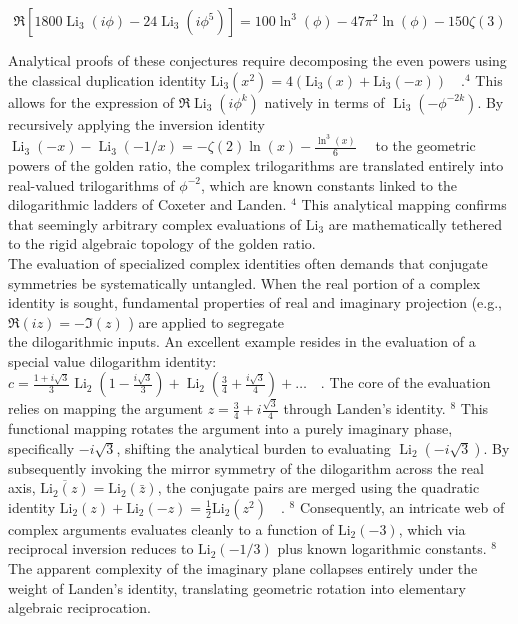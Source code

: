 \documentclass[10pt]{article}
\begin{document}
$$
\Re\left[1800 \operatorname{Li}_{3}(i \phi)-24 \operatorname{Li}_{3}\left(i \phi^{5}\right)\right]=100 \ln ^{3}(\phi)-47 \pi^{2} \ln (\phi)-150 \zeta(3)
$$

Analytical proofs of these conjectures require decomposing the even powers using the classical duplication identity $\mathrm{Li}_{3}\left(x^{2}\right)=4\left(\mathrm{Li}_{3}(x)+\mathrm{Li}_{3}(-x)\right) \quad .{ }^{4}$ This allows for the expression of $\Re \operatorname{Li}_{3}\left(i \phi^{k}\right)$ natively in terms of $\operatorname{Li}_{3}\left(-\phi^{-2 k}\right)$. By recursively applying the inversion identity $\operatorname{Li}_{3}(-x)-\operatorname{Li}_{3}(-1 / x)=-\zeta(2) \ln (x)-\frac{\ln ^{3}(x)}{6} \quad$ to the geometric powers of the golden ratio, the complex trilogarithms are translated entirely into real-valued trilogarithms of $\phi^{-2}$, which are known constants linked to the dilogarithmic ladders of Coxeter and Landen. ${ }^{4}$ This analytical mapping confirms that seemingly arbitrary complex evaluations of $\mathrm{Li}_{3}$ are mathematically tethered to the rigid algebraic topology of the golden ratio.\\
The evaluation of specialized complex identities often demands that conjugate symmetries be systematically untangled. When the real portion of a complex identity is sought, fundamental properties of real and imaginary projection (e.g., $\Re(i z)=-\Im(z)$ ) are applied to segregate\\
the dilogarithmic inputs. An excellent example resides in the evaluation of a special value dilogarithm identity: $c=\frac{1+i \sqrt{3}}{3} \operatorname{Li}_{2}\left(1-\frac{i \sqrt{3}}{3}\right)+\operatorname{Li}_{2}\left(\frac{3}{4}+\frac{i \sqrt{3}}{4}\right)+\ldots \quad$. The core of the evaluation relies on mapping the argument $z=\frac{3}{4}+i \frac{\sqrt{3}}{4}$ through Landen's identity. ${ }^{8}$ This functional mapping rotates the argument into a purely imaginary phase, specifically $-i \sqrt{3}$, shifting the analytical burden to evaluating $\operatorname{Li}_{2}(-i \sqrt{3})$. By subsequently invoking the mirror symmetry of the dilogarithm across the real axis, $\overline{\mathrm{Li}_{2}(z)}=\mathrm{Li}_{2}(\bar{z})$, the conjugate pairs are merged using the quadratic identity $\mathrm{Li}_{2}(z)+\mathrm{Li}_{2}(-z)=\frac{1}{2} \mathrm{Li}_{2}\left(z^{2}\right) \quad$. ${ }^{8}$ Consequently, an intricate web of complex arguments evaluates cleanly to a function of $\mathrm{Li}_{2}(-3)$, which via reciprocal inversion reduces to $\mathrm{Li}_{2}(-1 / 3)$ plus known logarithmic constants. ${ }^{8}$ The apparent complexity of the imaginary plane collapses entirely under the weight of Landen's identity, translating geometric rotation into elementary algebraic reciprocation.
\end{document}
